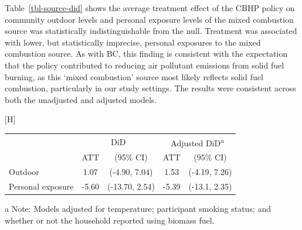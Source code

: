 \documentclass[
  letterpaper,
  DIV=11,
  numbers=noendperiod]{scrartcl}
\makeatletter
\renewenvironment{table}%
   {\renewcommand\familydefault\sfdefault
    \@float{table}}
   {\end@float}
\makeatother
\begin{document}
Table~\ref{tbl-source-did} shows the average treatment effect of the
CBHP policy on community outdoor levels and personal exposure levels of
the mixed combustion source was statistically indistinguishable from the
null. Treatment was associated with lower, but statistically imprecise,
personal exposures to the mixed combustion source. As with BC, this
finding is consistent with the expectation that the policy contributed
to reducing air pollutant emissions from solid fuel burning, as this
`mixed combustion' source most likely reflects solid fuel combustion,
particularly in our study settings. The results were consistent across
both the unadjusted and adjusted models.

\hypertarget{tbl-source-did}{}
\begin{table}[H]
\caption{\label{tbl-source-did}Average treatment effect (µg/m\textsuperscript{3}) for outdoor and
personal exposure to the mixed combustion source. }\tabularnewline

\centering
\begin{threeparttable}
\begin{tabular}{lcccc}
\toprule
\multicolumn{1}{c}{ } & \multicolumn{2}{c}{DiD} & \multicolumn{2}{c}{Adjusted DiD\textsuperscript{a}} \\
\cmidrule(l{3pt}r{3pt}){2-3} \cmidrule(l{3pt}r{3pt}){4-5}
  & ATT & (95\% CI) & ATT & (95\% CI)\\
\midrule
Outdoor & 1.07 & (-4.90, 7.04) & 1.53 & (-4.19, 7.26)\\
Personal exposure & -5.60 & (-13.70, 2.54) & -5.39 & (-13.1, 2.35)\\
\bottomrule
\end{tabular}
\begin{tablenotes}
\item[a] \small{Note: Models adjusted for temperature; participant smoking status; and whether or not the household reported using biomass fuel.}
\end{tablenotes}
\end{threeparttable}
\end{table}
\end{document}
